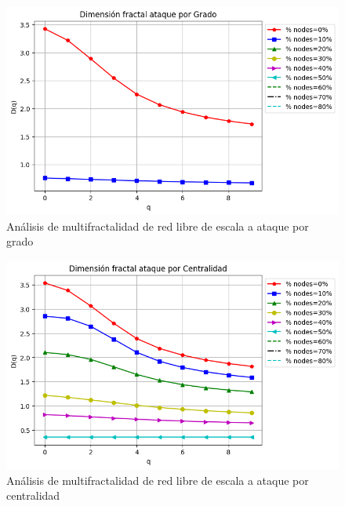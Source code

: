\begin{figure}[H]
    \centering
    \includegraphics[scale=0.7]{Capitulo6MultifractalidadYRobustez/imagenes/grafica_DqDegree20180512_143117ScaleFree8000Nodes.png}
    \caption{Análisis de multifractalidad de red libre de escala a ataque por grado }
\end{figure}

\begin{figure}[H]
    \centering
    \includegraphics[scale=0.7]{Capitulo6MultifractalidadYRobustez/imagenes/grafica_DqCentrality20180512_143117ScaleFree8000Nodes.png}
    \caption{Análisis de multifractalidad de red libre de escala a ataque por centralidad }
\end{figure}



